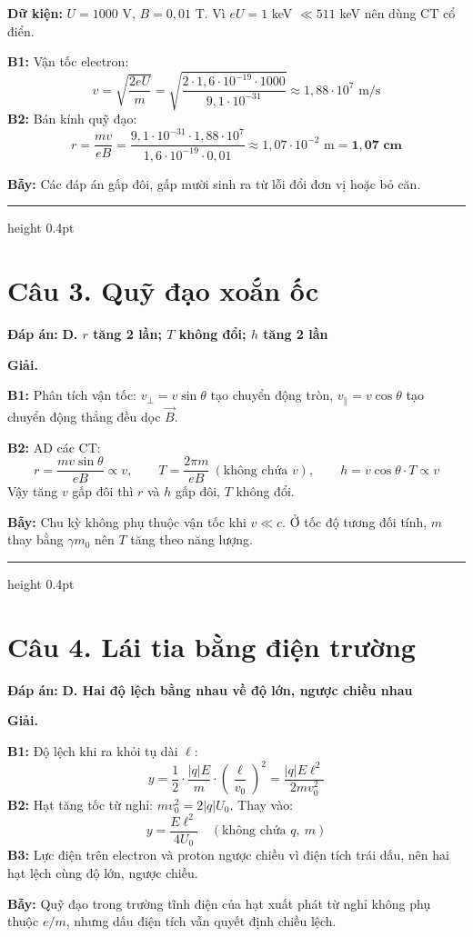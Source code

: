 \documentclass[11pt,a4paper]{article}
\renewcommand{\boldsymbol}[1]{\symbf{#1}}
\newcommand{\Cau}[2]{\par\Needspace{7\baselineskip}\section*{Câu #1. #2}}
\newcommand{\DapAn}[1]{\textbf{Đáp án:} #1\par}
\newcommand{\Bay}[1]{\par\textbf{Bẫy:} #1\par}
\newcommand{\PhanCachBai}{%
  \par\Needspace{7\baselineskip}%
  \addvspace{6pt}%
  {\color{black!40}\hrule height 0.4pt}%
  \nobreak\vspace{7pt}\nobreak
}
\begin{document}
\textbf{Dữ kiện:} $U=1000$ V, $B=0{,}01$ T. Vì $eU=1$ keV $\ll511$ keV nên dùng CT cổ điển.

\textbf{B1:} Vận tốc electron:
\begin{equation*}
    v=\sqrt{\frac{2eU}{m}}=\sqrt{\frac{2\cdot1{,}6\cdot10^{-19}\cdot1000}{9{,}1\cdot10^{-31}}}\approx1{,}88\cdot10^{7}\text{ m/s}
\end{equation*}
\textbf{B2:} Bán kính quỹ đạo:
\begin{equation*}
    r=\frac{mv}{eB}=\frac{9{,}1\cdot10^{-31}\cdot1{,}88\cdot10^{7}}{1{,}6\cdot10^{-19}\cdot0{,}01}\approx1{,}07\cdot10^{-2}\text{ m}=\boldsymbol{1{,}07\text{ cm}}
\end{equation*}
\Bay{Các đáp án gấp đôi, gấp mười sinh ra từ lỗi đổi đơn vị hoặc bỏ căn.}

\PhanCachBai
\Cau{3}{Quỹ đạo xoắn ốc}
\DapAn{\textbf{D. $r$ tăng 2 lần; $T$ không đổi; $h$ tăng 2 lần}}

\textbf{Giải.}

\textbf{B1:} Phân tích vận tốc: $v_\perp=v\sin\theta$ tạo chuyển động tròn, $v_\parallel=v\cos\theta$ tạo chuyển động thẳng đều dọc $\vec B$.

\textbf{B2:} AD các CT:
\begin{equation*}
    r=\frac{mv\sin\theta}{eB}\propto v,\qquad T=\frac{2\pi m}{eB}\ (\text{không chứa }v),\qquad h=v\cos\theta\cdot T\propto v
\end{equation*}
Vậy tăng $v$ gấp đôi thì $r$ và $h$ gấp đôi, $T$ không đổi.
\Bay{Chu kỳ không phụ thuộc vận tốc khi $v\ll c$. Ở tốc độ tương đối tính, $m$ thay bằng $\gamma m_0$ nên $T$ tăng theo năng lượng.}

\PhanCachBai
\Cau{4}{Lái tia bằng điện trường}
\DapAn{\textbf{D. Hai độ lệch bằng nhau về độ lớn, ngược chiều nhau}}

\textbf{Giải.}

\textbf{B1:} Độ lệch khi ra khỏi tụ dài $\ell$:
\begin{equation*}
    y=\frac12\cdot\frac{|q|E}{m}\cdot\left(\frac{\ell}{v_0}\right)^2=\frac{|q|E\ell^2}{2mv_0^2}
\end{equation*}
\textbf{B2:} Hạt tăng tốc từ nghỉ: $mv_0^2=2|q|U_0$. Thay vào:
\begin{equation*}
    y=\frac{E\ell^2}{4U_0}\quad(\text{không chứa }q,\ m)
\end{equation*}
\textbf{B3:} Lực điện trên electron và proton ngược chiều vì điện tích trái dấu, nên hai hạt lệch cùng độ lớn, ngược chiều.
\Bay{Quỹ đạo trong trường tĩnh điện của hạt xuất phát từ nghỉ không phụ thuộc $e/m$, nhưng dấu điện tích vẫn quyết định chiều lệch.}
\end{document}
